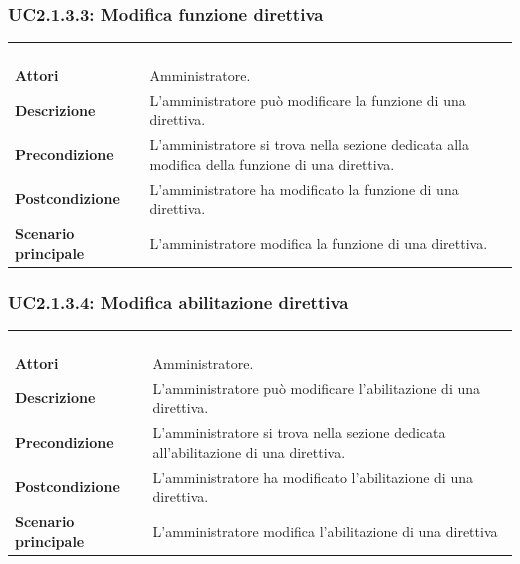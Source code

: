 \subsubsection{UC2.1.3.3: Modifica funzione direttiva}
\label{UC2.1.3.3}
\begin{longtable}{l|p{10cm}}
\rowcolor[gray]{0.8} \multicolumn{2}{c}{} \\
\rowcolor[gray]{0.8} \multicolumn{2}{c}{\textbf{UC2.1.3.3 - Modifica funzione direttiva}} \\
\rowcolor[gray]{0.8} \multicolumn{2}{c}{} \\
\hline
&\\
\textbf{Attori} & Amministratore.\\[7pt]
\textbf{Descrizione} & L'amministratore può modificare la funzione di una direttiva.\\[7pt]
\textbf{Precondizione} & L'amministratore si trova nella sezione dedicata alla modifica della funzione di una direttiva.\\[7pt]
\textbf{Postcondizione} & L'amministratore ha modificato la funzione di una direttiva.\\[7pt]
\textbf{Scenario principale} &L'amministratore modifica la funzione di una direttiva.\\[7pt]\hline
\end{longtable}

\newpage
\subsubsection{UC2.1.3.4: Modifica abilitazione direttiva}
\label{UC2.1.3.4}
\begin{longtable}{l|p{10cm}}
\rowcolor[gray]{0.8} \multicolumn{2}{c}{} \\
\rowcolor[gray]{0.8} \multicolumn{2}{c}{\textbf{UC2.1.3.4 - Modifica abilitazione direttiva}} \\
\rowcolor[gray]{0.8} \multicolumn{2}{c}{} \\
\hline
&\\
\textbf{Attori} & Amministratore.\\[7pt]
\textbf{Descrizione} & L'amministratore può modificare l'abilitazione di una direttiva.\\[7pt]
\textbf{Precondizione} & L'amministratore si trova nella sezione dedicata all'abilitazione di una direttiva.\\[7pt]
\textbf{Postcondizione} & L'amministratore ha modificato l'abilitazione di una direttiva.\\[7pt]
\textbf{Scenario principale} &L'amministratore modifica l'abilitazione di una direttiva\\[7pt]\hline
\end{longtable}

